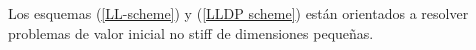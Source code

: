 Los esquemas (\ref{LL-scheme}) y (\ref{LLDP scheme}) están orientados a resolver problemas de valor inicial no stiff de dimensiones pequeñas. 

